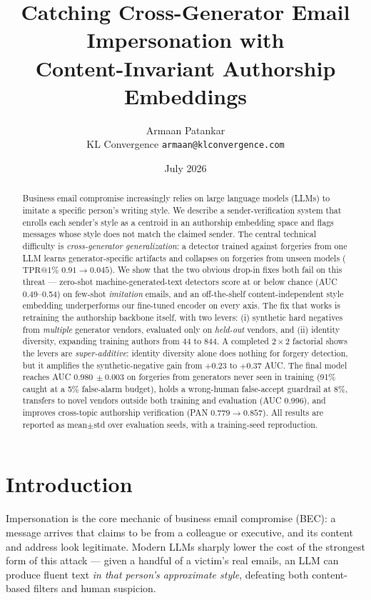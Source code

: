 \documentclass[11pt]{article}
\title{\bfseries Catching Cross-Generator Email Impersonation with\\ Content-Invariant Authorship Embeddings}
\author{Armaan Patankar\\ \small KL Convergence \quad \texttt{armaan@klconvergence.com}}
\date{July 2026}
\makeatletter
\newcommand{\tprat}[1]{\ensuremath{\mathrm{TPR}@#1\%}}
\newcommand{\ms}[2]{\ensuremath{#1{\scriptstyle\,\pm #2}}}
\makeatother
\begin{document}
\maketitle

\begin{abstract}
\noindent
Business email compromise increasingly relies on large language models (LLMs) to imitate a specific
person's writing style. We describe a sender-verification system that enrolls each sender's style as a
centroid in an authorship embedding space and flags messages whose style does not match the claimed
sender. The central technical difficulty is \emph{cross-generator generalization}: a detector trained
against forgeries from one LLM learns generator-specific artifacts and collapses on forgeries from
unseen models (\tprat{1} $0.91 \to 0.045$). We show that the two obvious drop-in fixes both fail on
this threat --- zero-shot machine-generated-text detectors score at or below chance
(AUC 0.49--0.54) on few-shot \emph{imitation} emails, and an off-the-shelf content-independent style
embedding underperforms our fine-tuned encoder on every axis. The fix that works is retraining the
authorship backbone itself, with two levers: (i) synthetic hard negatives from \emph{multiple}
generator vendors, evaluated only on \emph{held-out} vendors, and (ii) identity diversity, expanding
training authors from 44 to 844. A completed $2{\times}2$ factorial shows the levers are
\emph{super-additive}: identity diversity alone does nothing for forgery detection, but it amplifies
the synthetic-negative gain from $+0.23$ to $+0.37$ AUC. The final model reaches
AUC \ms{0.980}{0.003} on forgeries from generators never seen in training (91\% caught at a 5\%
false-alarm budget), holds a wrong-human false-accept guardrail at 8\%, transfers to novel vendors
outside both training and evaluation (AUC 0.996), and improves cross-topic authorship verification
(PAN $0.779 \to 0.857$). All results are reported as mean$\pm$std over evaluation seeds, with a
training-seed reproduction.
\end{abstract}

\tableofcontents

\section{Introduction}
\label{sec:intro}

Impersonation is the core mechanic of business email compromise (BEC): a message arrives that
claims to be from a colleague or executive, and its content and address look legitimate. Modern
LLMs sharply lower the cost of the strongest form of this attack --- given a handful of a victim's
real emails, an LLM can produce fluent text \emph{in that person's approximate style}, defeating
both content-based filters and human suspicion.
\end{document}
